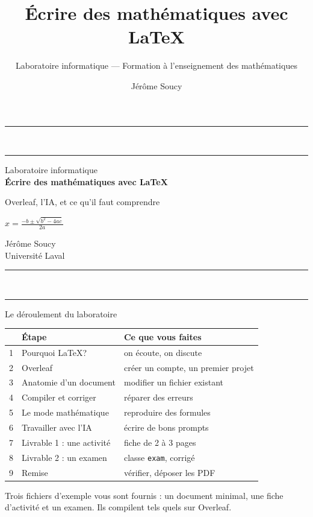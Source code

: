 \documentclass[aspectratio=169, 11pt]{beamer}
\title[Laboratoire LaTeX]{Écrire des mathématiques avec \LaTeX}
\subtitle{Laboratoire informatique --- Formation à l'enseignement des mathématiques}
\author{Jérôme Soucy}
\institute{Université Laval --- Département de mathématiques et de statistique}
\date{}
\begin{document}
\begin{frame}[plain]
  \begin{center}
    {\color{sectioncolor}\rule{0.5\textwidth}{0.8pt}}\\[3pt]
    {\color{coveraccent}\rule{0.14\textwidth}{1.8pt}}

    \vspace{0.55cm}
    {\large\color{gray}Laboratoire informatique}\\[3pt]
    {\LARGE\bfseries\color{sectioncolor}Écrire des mathématiques avec \LaTeX}

    \vspace{0.35cm}
    {\normalsize\color{sectioncolor}Overleaf, l'IA, et ce qu'il faut comprendre}

    \vspace{0.5cm}
    {\color{sectioncolor}%
      $\displaystyle x = \frac{-b \pm \sqrt{b^2 - 4ac}}{2a}$}

    \vspace{0.5cm}
    {\sffamily\color{sectioncolor}Jérôme Soucy}\\[1pt]
    {\small\color{gray}Université Laval}

    \vspace{0.35cm}
    {\color{coveraccent}\rule{0.14\textwidth}{1.8pt}}\\[3pt]
    {\color{sectioncolor}\rule{0.5\textwidth}{0.8pt}}
  \end{center}
\end{frame}

\begin{frame}{Le déroulement du laboratoire}
  \small
  \begin{center}
  \begin{tabular}{rll}
    \toprule
    & Étape & Ce que vous faites \\
    \midrule
    1 & Pourquoi \LaTeX ? & on écoute, on discute \\
    2 & Overleaf & créer un compte, un premier projet \\
    3 & Anatomie d'un document & modifier un fichier existant \\
    4 & Compiler et corriger & réparer des erreurs \\
    5 & Le mode mathématique & reproduire des formules \\
    6 & Travailler avec l'IA & écrire de bons prompts \\
    7 & Livrable 1 : une activité & fiche de 2 à 3 pages \\
    8 & Livrable 2 : un examen & classe \texttt{exam}, corrigé \\
    9 & Remise & vérifier, déposer les PDF \\
    \bottomrule
  \end{tabular}
  \end{center}
  \vspace{4pt}
  Trois fichiers d'exemple vous sont fournis : un document minimal, une
  fiche d'activité et un examen. Ils compilent tels quels sur Overleaf.
\end{frame}
\end{document}
